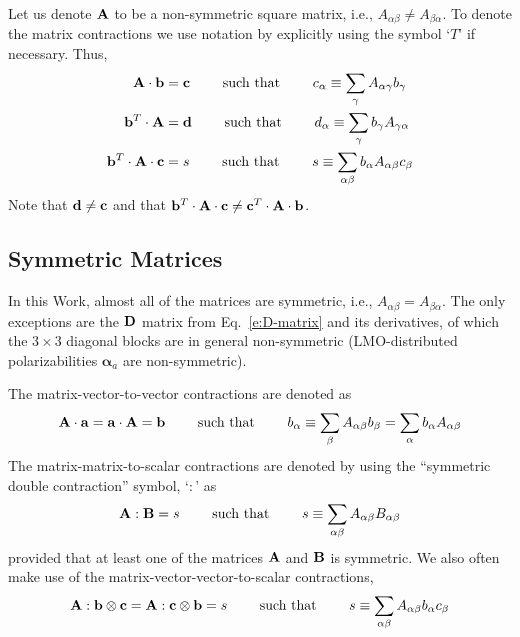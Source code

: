 \documentclass[a4paper,titlepage,twoside,fleqn,12pt]{book}
\newcommand{\BM}[1]{\bm{#1}}
\begin{document}
\begin{appendices}
Let us denote ${\bf A}$ to be a non-symmetric square matrix, i.e., 
$A_{\alpha\beta}\ne A_{\beta\alpha}$. To denote the matrix contractions
we use notation by explicitly using the symbol `$T$' if necessary.
Thus,
%
\begin{subequations}
\begin{align}
 {\bf A} \cdot {\bf b} &= {\bf c}
 \qquad\text{ such that } 
 \qquad c_{\alpha}  \equiv \sum_\gamma A_{\alpha\gamma} b_{\gamma} 
%
\\
{\bf b}^T \cdot {\bf A}   &= {\bf d}
 \qquad\text{ such that } 
 \qquad d_{\alpha}  \equiv \sum_\gamma b_{\gamma} A_{\gamma\alpha}
%
\\
{\bf b}^T \cdot {\bf A} \cdot {\bf c}  &= s
 \qquad\text{ such that } 
 \qquad s \equiv \sum_{\alpha\beta} b_{\alpha} A_{\alpha\beta} c_{\beta}
\end{align}
\end{subequations}
%
Note that ${\bf d} \ne {\bf c}$ and that 
${\bf b}^T \cdot {\bf A} \cdot {\bf c} \ne {\bf c}^T \cdot {\bf A} \cdot {\bf b}$.

\subsection{Symmetric Matrices}

In this Work, almost all of the matrices are symmetric, i.e., 
$A_{\alpha\beta}= A_{\beta\alpha}$. The only exceptions
are the ${\bf D}$ matrix from Eq.~\eqref{e:D-matrix} 
and its derivatives, of which the $3\times 3$ diagonal blocks
are in general non-symmetric (LMO\hyp{}distributed polarizabilities ${\BM \alpha}_a$
are non\hyp{}symmetric). 

The matrix\hyp{}vector\hyp{}to\hyp{}vector contractions are denoted as
%
\begin{equation}
 {\bf A} \cdot {\bf a} = {\bf a} \cdot {\bf A} = {\bf b} 
 \qquad\text{ such that } 
 \qquad b_\alpha \equiv \sum_{\beta} A_{\alpha\beta} b_{\beta} = \sum_{\alpha} b_{\alpha} A_{\alpha\beta} 
\end{equation}
%
The matrix\hyp{}matrix\hyp{}to\hyp{}scalar 
contractions are denoted
by using the ``symmetric double contraction''
symbol, `$:$' as
%
\begin{equation}
 {\bf A} : {\bf B} = s \qquad\text{ such that } 
                                   \qquad s \equiv \sum_{\alpha\beta} A_{\alpha\beta} B_{\alpha\beta}
\end{equation}
%
provided that at least one of the matrices ${\bf A}$ and ${\bf B}$ is symmetric.
We also often make use of the matrix\hyp{}vector\hyp{}vector\hyp{}to\hyp{}scalar contractions,
%
\begin{equation}
 {\bf A} : {\bf b} \otimes {\bf c} = {\bf A} : {\bf c} \otimes {\bf b} = s
 \qquad\text{ such that } 
 \qquad s \equiv \sum_{\alpha\beta} A_{\alpha\beta} b_{\alpha} c_{\beta}
\end{equation}
%


\end{appendices}
\end{document}
